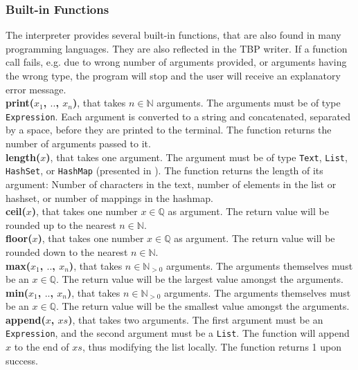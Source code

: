 \subsubsection{Built-in Functions}

The interpreter provides several built-in functions, that are also found in many programming languages. They are also reflected in the TBP writer. If a function call fails, e.g. due to wrong number of arguments provided, or arguments having the wrong type, the program will stop and the user will receive an explanatory error message. \\

\textbf{print($x_{1}$, $..$, $x_{n}$)}, that takes $n \in \mathbb{N}$ arguments. The arguments must be of type \texttt{Expression}. Each argument is converted to a string and concatenated, separated by a space, before they are printed to the terminal. The function returns the number of arguments passed to it. \\

\textbf{length($x$)}, that takes one argument. The argument must be of type \texttt{Text}, \texttt{List}, \texttt{HashSet}, or \texttt{HashMap} (presented in ). The function returns the length of its argument: Number of characters in the text, number of elements in the list or hashset, or number of mappings in the hashmap. \\

\textbf{ceil($x$)}, that takes one number $x \in \mathbb{Q}$ as argument. The return value will be rounded up to the nearest $n \in \mathbb{N}$. \\

\textbf{floor($x$)}, that takes one number $x \in \mathbb{Q}$ as argument. The return value will be rounded down to the nearest $n \in \mathbb{N}$. \\

\textbf{max($x_{1}$, $..$, $x_{n}$)}, that takes $n \in \mathbb{N}_{>0}$ arguments. The arguments themselves must be an $x \in \mathbb{Q}$. The return value will be the largest value amongst the arguments. \\

\textbf{min($x_{1}$, $..$, $x_{n}$)}, that takes $n \in \mathbb{N}_{>0}$ arguments. The arguments themselves must be an $x \in \mathbb{Q}$. The return value will be the smallest value amongst the arguments. \\

\textbf{append($x$, $xs$)}, that takes two arguments. The first argument must be an \texttt{Expression}, and the second argument must be a \texttt{List}. The function will append $x$ to the end of $xs$, thus modifying the list locally. The function returns 1 upon success. \\

